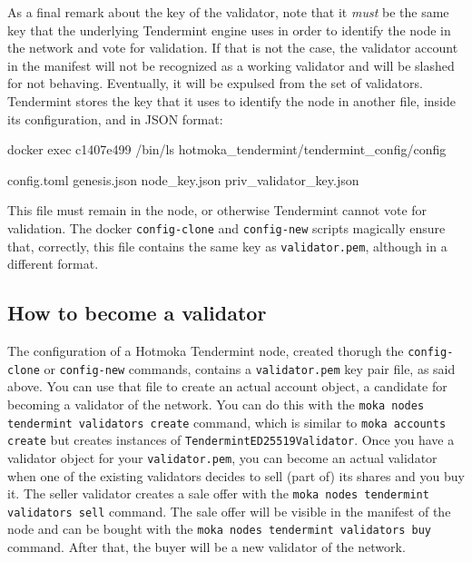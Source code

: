 As a final remark about the key of the validator, note that it \emph{must} be the same
key that the underlying Tendermint engine uses in order to identify the node in the network
and vote for validation. If that is not the case, the validator account in the
manifest will not be recognized as a working validator and will be slashed for
not behaving. Eventually, it will be expulsed from the set of validators.
Tendermint stores the key that it uses to identify the node in another file, inside
its configuration, and in JSON format:
%
\begin{shellcommandbox}\begin{ttlst}
docker exec c1407e499 /bin/ls hotmoka_tendermint/tendermint_config/config
\end{ttlst}\end{shellcommandbox}
%
\begin{shellbox}\begin{ttlst}
config.toml
genesis.json
node_key.json
priv_validator_key.json
\end{ttlst}\end{shellbox}
%
This file must remain in the node, or otherwise Tendermint cannot vote for validation.
The docker \texttt{config-clone} and \texttt{config-new} scripts magically ensure that,
correctly, this file contains the same key
as \texttt{validator.pem}, although in a different format.

\subsection{How to become a validator}\label{subsec:become_validator}

The configuration of a Hotmoka Tendermint node, created thorugh the \texttt{config-clone}
or \texttt{config-new} commands,
contains a \texttt{validator.pem} key pair file, as said above. You can use that file to create an actual
account object, a candidate for becoming a validator of the network. You can do this with the
\texttt{moka nodes tendermint validators create}
command, which is similar to
\texttt{moka accounts create} but creates instances of
\texttt{TendermintED25519Validator}.
Once you have a validator object for your \texttt{validator.pem}, you can become an actual validator
when one of the existing validators decides to sell (part of) its shares and you buy it.
The seller validator creates a sale offer with the
\texttt{moka nodes tendermint validators sell}
command. The sale offer will be visible in the manifest of the node and can be bought with
the \texttt{moka nodes tendermint validators buy}
command. After that, the buyer will be a new validator of the network.

